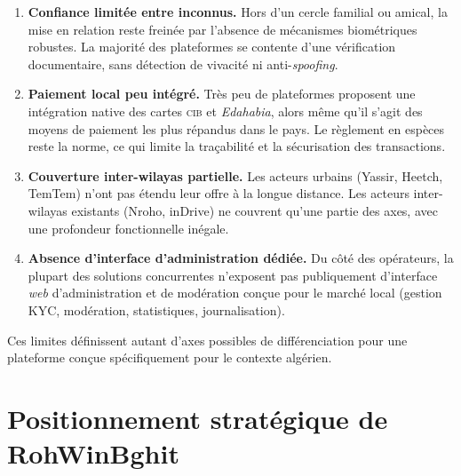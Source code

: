 \begin{enumerate}
  \item \textbf{Confiance limitée entre inconnus.} Hors d'un cercle familial ou amical, la mise en relation reste freinée par l'absence de mécanismes biométriques robustes. La majorité des plateformes se contente d'une vérification documentaire, sans détection de vivacité ni anti-\textit{spoofing}.
  \item \textbf{Paiement local peu intégré.} Très peu de plateformes proposent une intégration native des cartes \textsc{cib} et \textit{Edahabia}, alors même qu'il s'agit des moyens de paiement les plus répandus dans le pays. Le règlement en espèces reste la norme, ce qui limite la traçabilité et la sécurisation des transactions.
  \item \textbf{Couverture inter-wilayas partielle.} Les acteurs urbains (Yassir, Heetch, TemTem) n'ont pas étendu leur offre à la longue distance. Les acteurs inter-wilayas existants (Nroho, inDrive) ne couvrent qu'une partie des axes, avec une profondeur fonctionnelle inégale.
  \item \textbf{Absence d'interface d'administration dédiée.} Du côté des opérateurs, la plupart des solutions concurrentes n'exposent pas publiquement d'interface \textit{web} d'administration et de modération conçue pour le marché local (gestion KYC, modération, statistiques, journalisation).
\end{enumerate}

Ces limites définissent autant d'axes possibles de différenciation pour une plateforme conçue spécifiquement pour le contexte algérien.

\section{Positionnement stratégique de RohWinBghit}
\label{sec:positionnement}

